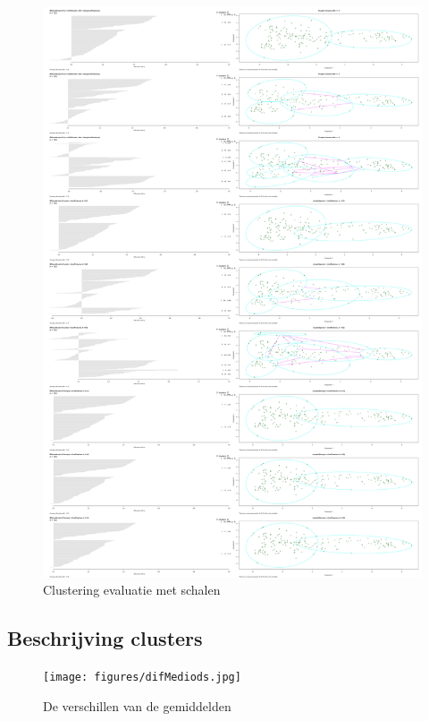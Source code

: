 \documentclass[a4paper,kulak]{kulakarticle}
\begin{document}
\begin{figure}[H]
	\centering
	\includegraphics[height=\textheight]{figures/clusteringEvaluationScaled.jpg}
	\caption{Clustering evaluatie met schalen}
	\label{fig:ce}
\end{figure}

 \subsection{Beschrijving clusters}

\begin{figure}[H]
	\centering
	\texttt{[image: figures/difMediods.jpg]}
	\caption{De verschillen van de gemiddelden}
	\label{fig:dm}
\end{figure}
\end{document}
